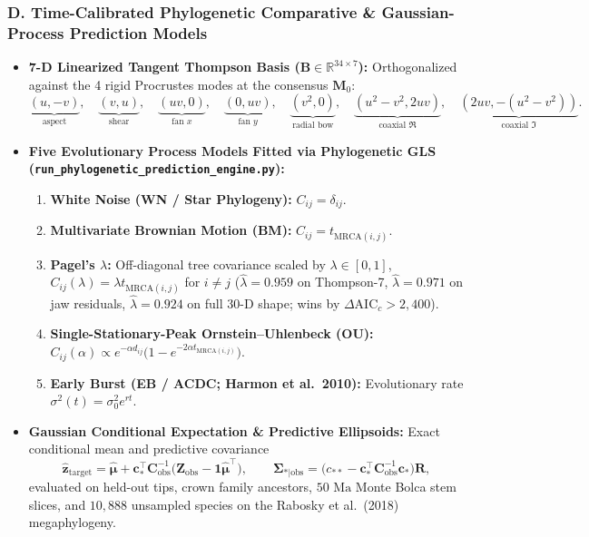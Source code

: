 \documentclass[10.5pt,a4paper]{article}
\newcommand{\code}[1]{{\footnotesize\nolinkurl{#1}}}
\begin{document}
\subsubsection*{D. Time-Calibrated Phylogenetic Comparative \& Gaussian-Process Prediction Models}
\begin{itemize}
  \setlength{\itemsep}{3pt}
  \item \textbf{7-D Linearized Tangent Thompson Basis ($\bm{B} \in \mathbb{R}^{34 \times 7}$):} Orthogonalized against the 4 rigid Procrustes modes at the consensus $\bm{M}_0$:
  \[
    \underbrace{(u, -v)}_{\text{aspect}}, \quad
    \underbrace{(v, u)}_{\text{shear}}, \quad
    \underbrace{(u v, 0)}_{\text{fan } x}, \quad
    \underbrace{(0, u v)}_{\text{fan } y}, \quad
    \underbrace{(v^2, 0)}_{\text{radial bow}}, \quad
    \underbrace{(u^2 - v^2, 2 u v)}_{\text{coaxial }\Re}, \quad
    \underbrace{(2 u v, -(u^2 - v^2))}_{\text{coaxial }\Im}.
  \]
  \item \textbf{Five Evolutionary Process Models Fitted via Phylogenetic GLS (\code{run_phylogenetic_prediction_engine.py}):}
  \begin{enumerate}
    \setlength{\itemsep}{2pt}
    \item \textbf{White Noise (WN / Star Phylogeny):} $C_{ij} = \delta_{ij}$.
    \item \textbf{Multivariate Brownian Motion (BM):} $C_{ij} = t_{\mathrm{MRCA}(i,j)}$.
    \item \textbf{Pagel's $\lambda$:} Off-diagonal tree covariance scaled by $\lambda \in [0, 1]$, $C_{ij}(\lambda) = \lambda t_{\mathrm{MRCA}(i,j)}$ for $i \neq j$ ($\hat{\lambda} = 0.959$ on Thompson-7, $\hat{\lambda} = 0.971$ on jaw residuals, $\hat{\lambda} = 0.924$ on full 30-D shape; wins by $\Delta\mathrm{AIC}_c > 2{,}400$).
    \item \textbf{Single-Stationary-Peak Ornstein--Uhlenbeck (OU):} $C_{ij}(\alpha) \propto e^{-\alpha d_{ij}}\bigl(1 - e^{-2\alpha t_{\mathrm{MRCA}(i,j)}}\bigr)$.
    \item \textbf{Early Burst (EB / ACDC; Harmon et al.\ 2010):} Evolutionary rate $\sigma^2(t) = \sigma_0^2 e^{r t}$.
  \end{enumerate}
  \item \textbf{Gaussian Conditional Expectation \& Predictive Ellipsoids:} Exact conditional mean and predictive covariance
  \[
    \hat{\bm{z}}_{\mathrm{target}} = \hat{\bm{\mu}} + \bm{c}_*^\top \bm{C}_{\mathrm{obs}}^{-1}\bigl(\bm{Z}_{\mathrm{obs}} - \bm{1}\hat{\bm{\mu}}^\top\bigr), \qquad
    \bm{\Sigma}_{*|\mathrm{obs}} = \bigl(c_{**} - \bm{c}_*^\top \bm{C}_{\mathrm{obs}}^{-1} \bm{c}_*\bigr)\hat{\bm{R}},
  \]
  evaluated on held-out tips, crown family ancestors, $50\text{ Ma}$ Monte Bolca stem slices, and $10{,}888$ unsampled species on the Rabosky et al.\ (2018) megaphylogeny.
\end{itemize}
\end{document}
